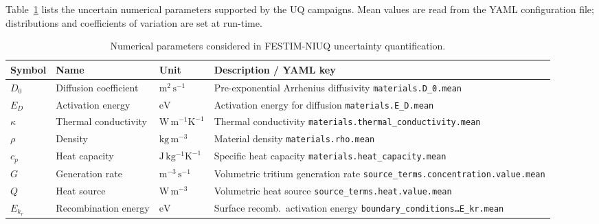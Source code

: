 \documentclass[11pt,a4paper]{article}
\begin{document}
Table~\ref{tab:params} lists the uncertain numerical parameters supported
by the UQ campaigns.  Mean values are read from the YAML configuration
file; distributions and coefficients of variation are set at run-time.

\begin{table}[htbp]
\centering
\caption{Numerical parameters considered in FESTIM-NIUQ uncertainty quantification.}
\label{tab:params}
\footnotesize
\setlength{\tabcolsep}{4pt}
\begin{tabularx}{\textwidth}{@{} l l l X @{}}
\toprule
\textbf{Symbol} & \textbf{Name} & \textbf{Unit} & \textbf{Description / YAML key} \\
\midrule
$D_0$         & Diffusion coefficient       & $\mathrm{m^2\,s^{-1}}$      & Pre-exponential Arrhenius diffusivity \newline \texttt{materials.D\_0.mean} \\[2pt]
$E_D$         & Activation energy           & $\mathrm{eV}$               & Activation energy for diffusion \newline \texttt{materials.E\_D.mean} \\[2pt]
$\kappa$      & Thermal conductivity        & $\mathrm{W\,m^{-1}K^{-1}}$  & Thermal conductivity \newline \texttt{materials.thermal\_conductivity.mean} \\[2pt]
$\rho$        & Density                     & $\mathrm{kg\,m^{-3}}$       & Material density \newline \texttt{materials.rho.mean} \\[2pt]
$c_p$         & Heat capacity               & $\mathrm{J\,kg^{-1}K^{-1}}$ & Specific heat capacity \newline \texttt{materials.heat\_capacity.mean} \\[2pt]
$G$           & Generation rate             & $\mathrm{m^{-3}\,s^{-1}}$   & Volumetric tritium generation rate \newline \texttt{source\_terms.concentration.value.mean} \\[2pt]
$Q$           & Heat source                 & $\mathrm{W\,m^{-3}}$        & Volumetric heat source \newline \texttt{source\_terms.heat.value.mean} \\[2pt]
$E_{k_r}$     & Recombination energy        & $\mathrm{eV}$               & Surface recomb.\ activation energy \newline \texttt{boundary\_conditions\ldots E\_kr.mean} \\[2pt]

\end{tabularx}
\end{table}
\end{document}
